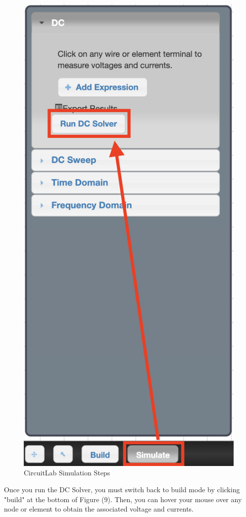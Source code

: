 \documentclass[12pt]{article}
\begin{document}
\begin{figure}[H]
    \begin{center}
        \includegraphics[scale=0.5]{circuit-lab-tut.png}
        \caption { CircuitLab Simulation Steps}
    \end{center}
\end{figure}

Once you run the DC Solver, you must switch back to build mode by clicking "build" at the bottom of Figure (9). Then, you can hover your mouse over any node or element to obtain the associated voltage and currents.
\end{document}
